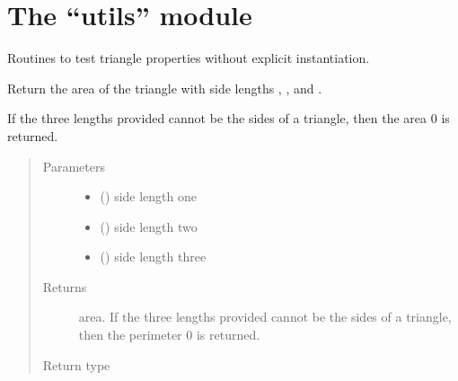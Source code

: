 \documentclass[letterpaper,10pt,english]{sphinxmanual}
\begin{document}
\section{The “utils” module}
\label{\detokenize{api:module-trianglelib.utils}}\label{\detokenize{api:the-utils-module}}
Routines to test triangle properties without explicit instantiation.

\begin{fulllineitems}
\label{\detokenize{api:trianglelib.utils.compute_area}}
Return the area of the triangle with side lengths , , and .

If the three lengths provided cannot be the sides of a triangle,
then the area 0 is returned.
\begin{quote}\begin{description}
\item[{Parameters}] \leavevmode\begin{itemize}
\item {} 
 () \textendash{} side length one

\item {} 
 () \textendash{} side length two

\item {} 
 () \textendash{} side length three

\end{itemize}

\item[{Returns}] \leavevmode
area. If the three lengths provided cannot be the sides of a triangle, then the perimeter 0 is returned.

\item[{Return type}] \leavevmode
{}

\end{description}\end{quote}

\end{fulllineitems}
\end{document}
